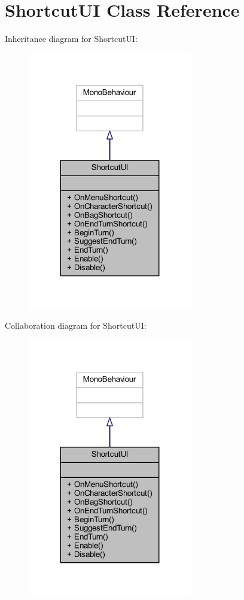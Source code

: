 \hypertarget{class_shortcut_u_i}{}\section{Shortcut\+UI Class Reference}
\label{class_shortcut_u_i}


Inheritance diagram for Shortcut\+UI\+:\nopagebreak
\begin{figure}[H]
\begin{center}
\leavevmode
\includegraphics[width=203pt]{class_shortcut_u_i__inherit__graph}
\end{center}
\end{figure}


Collaboration diagram for Shortcut\+UI\+:\nopagebreak
\begin{figure}[H]
\begin{center}
\leavevmode
\includegraphics[width=203pt]{class_shortcut_u_i__coll__graph}
\end{center}
\end{figure}
